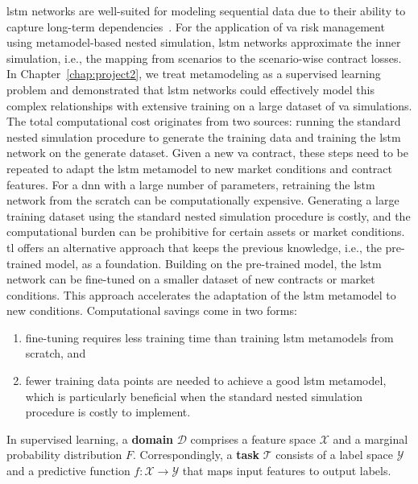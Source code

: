 \gls{lstm} networks are well-suited for modeling sequential data due to their ability to capture long-term dependencies~\citep{hochreiter1997long}.
For the application of \gls{va} risk management using metamodel-based nested simulation, \gls{lstm} networks approximate the inner simulation, i.e., the mapping from scenarios to the scenario-wise contract losses.
In Chapter~\ref{chap:project2}, we treat metamodeling as a supervised learning problem and demonstrated that \gls{lstm} networks could effectively model this complex relationships with extensive training on a large dataset of \gls{va} simulations.
The total computational cost originates from two sources: running the standard nested simulation procedure to generate the training data and training the \gls{lstm} network on the generate dataset.
Given a new \gls{va} contract, these steps need to be repeated to adapt the \gls{lstm} metamodel to new market conditions and contract features.
For a \gls{dnn} with a large number of parameters, retraining the \gls{lstm} network from the scratch can be computationally expensive.
Generating a large training dataset using the standard nested simulation procedure is costly, and the computational burden can be prohibitive for certain assets or market conditions.
\gls{tl} offers an alternative approach that keeps the previous knowledge, i.e., the pre-trained model, as a foundation.
Building on the pre-trained model, the \gls{lstm} network can be fine-tuned on a smaller dataset of new contracts or market conditions.
This approach accelerates the adaptation of the \gls{lstm} metamodel to new conditions.
Computational savings come in two forms: 
\begin{enumerate}
    \item   fine-tuning requires less training time than training \gls{lstm} metamodels from scratch, and
    \item   fewer training data points are needed to achieve a good \gls{lstm} metamodel, which is particularly beneficial when the standard nested simulation procedure is costly to implement.
\end{enumerate}

In supervised learning, a \textbf{domain} $\mathcal{D}$ comprises a feature space $\mathcal{X}$ and a marginal probability distribution $F$. Correspondingly, a \textbf{task} $\mathcal{T}$ consists of a label space $\mathcal{Y}$ and a predictive function $f: \mathcal{X} \rightarrow \mathcal{Y}$ that maps input features to output labels.

